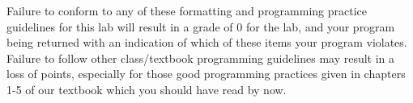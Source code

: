 \documentclass[11pt]{article}
\begin{document}
Failure to conform to any of these formatting and programming practice
guidelines for this lab will result in a grade of 0 for the lab, and
your program being returned with an indication of which of these items
your program violates.  Failure to follow other class/textbook
programming guidelines may result in a loss of points, especially for
those good programming practices given in chapters 1-5 of our textbook
which you should have read by now.
\end{document}

